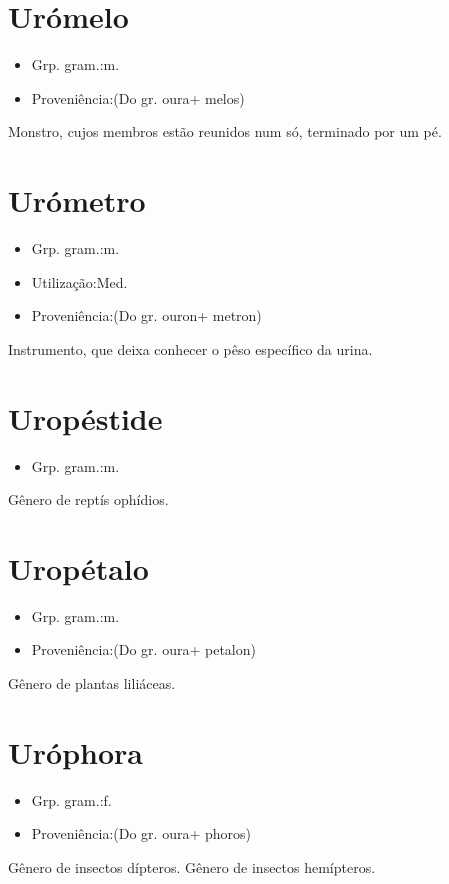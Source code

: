 \documentclass{article}
\begin{document}
\section{Urómelo}
\begin{itemize}
\item {Grp. gram.:m.}
\end{itemize}
\begin{itemize}
\item {Proveniência:(Do gr. \textunderscore oura\textunderscore  + \textunderscore melos\textunderscore )}
\end{itemize}
Monstro, cujos membros estão reunidos num só, terminado por um pé.
\section{Urómetro}
\begin{itemize}
\item {Grp. gram.:m.}
\end{itemize}
\begin{itemize}
\item {Utilização:Med.}
\end{itemize}
\begin{itemize}
\item {Proveniência:(Do gr. \textunderscore ouron\textunderscore  + \textunderscore metron\textunderscore )}
\end{itemize}
Instrumento, que deixa conhecer o pêso específico da urina.
\section{Uropéstide}
\begin{itemize}
\item {Grp. gram.:m.}
\end{itemize}
Gênero de reptís ophídios.
\section{Uropétalo}
\begin{itemize}
\item {Grp. gram.:m.}
\end{itemize}
\begin{itemize}
\item {Proveniência:(Do gr. \textunderscore oura\textunderscore  + \textunderscore petalon\textunderscore )}
\end{itemize}
Gênero de plantas liliáceas.
\section{Uróphora}
\begin{itemize}
\item {Grp. gram.:f.}
\end{itemize}
\begin{itemize}
\item {Proveniência:(Do gr. \textunderscore oura\textunderscore  + \textunderscore phoros\textunderscore )}
\end{itemize}
Gênero de insectos dípteros.
Gênero de insectos hemípteros.
\end{document}

